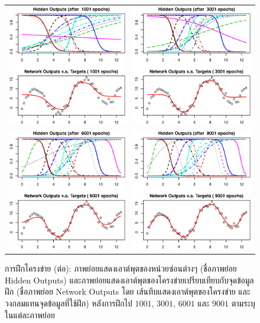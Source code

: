 \begin{figure}[htp]
  \centering
  \caption{การฝึกโครงข่าย (ต่อ): ภาพย่อยแสดงเอาต์พุตของหน่วยซ่อนต่างๆ (ชื่อภาพย่อย Hidden Outputs) และภาพย่อยแสดงเอาต์พุตของโครงข่ายเปรียบเทียบกับจุดข้อมูลฝึก (ชื่อภาพย่อย Network Outputs โดย เส้นทึบแสดงเอาต์พุตของโครงข่าย และวงกลมแทนจุดข้อมูลที่ใช้ฝึก) หลังการฝึกไป $1001$, $3001$, $6001$ และ $9001$ ตามระบุในแต่ละภาพย่อย}
  \label{fig: ANN simple example training (continued)}
  \begin{tabular}{cc}
    \includegraphics[width=60mm]{04ANN/simpleN1001.eps}&
    \includegraphics[width=60mm]{04ANN/simpleN3001.eps}\\
    \includegraphics[width=60mm]{04ANN/simpleN6001.eps}&
    \includegraphics[width=60mm]{04ANN/simpleN9001.eps}\\
  \end{tabular}
\end{figure}

